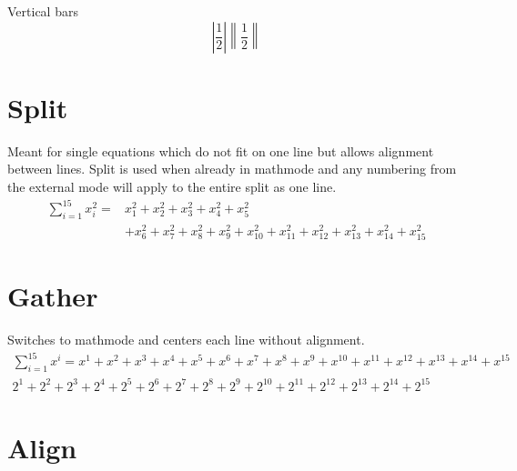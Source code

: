 \documentclass[12pt,a4paper,onecolumn]{article}
\begin{document}
\noindent
Vertical bars
\begin{equation}
\left\lvert \frac{1}{2}\right\rvert \left\lVert \frac{1}{2}\right\rVert
\end{equation}



\section[Split]{Split}

Meant for single equations which do not fit on one line but allows alignment between lines. Split is used when already in mathmode and any numbering from the external mode will apply to the entire split as one line.
\begin{equation}\begin{split}\label{split}
\sum_{i=1}^{15} x_i^2 =& x_1^2 + x_2^2 + x_3^2 + x_4^2 + x_5^2 \\
&+ x_6^2 + x_7^2 + x_8^2 + x_9^2 + x_{10}^2+ x_{11}^2 + x_{12}^2 + x_{13}^2 + x_{14}^2 + x_{15}^2
\end{split}\end{equation}

\section[Gather]{Gather}


Switches to mathmode and centers each line without alignment.
\begin{gather}
\label{gathereq} \sum_{i=1}^{15} x^i = x^1 + x^2 + x^3 + x^4 + x^5 + x^6 + x^7 + x^8 + x^9 + x^{10} + x^{11} + x^{12} + x^{13} + x^{14} + x^{15}\\%
2^1 + 2^2 + 2^3 + 2^4 + 2^5 + 2^6 + 2^7 + 2^8 + 2^9 + 2^{10} + 2^{11} + 2^{12} + 2^{13} + 2^{14} + 2^{15}\nonumber %
\end{gather}


\section[Align]{Align}
\end{document}
